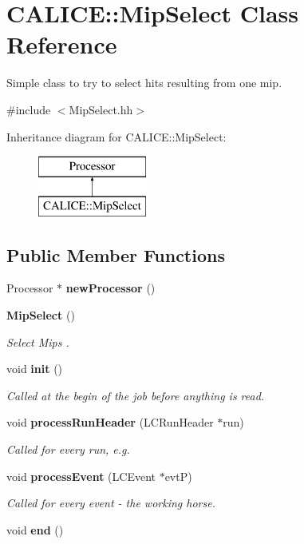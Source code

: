 \section{C\-A\-L\-I\-C\-E\-:\-:Mip\-Select Class Reference}
\label{classCALICE_1_1MipSelect}


Simple class to try to select hits resulting from one mip.  




{\ttfamily \#include $<$Mip\-Select.\-hh$>$}

Inheritance diagram for C\-A\-L\-I\-C\-E\-:\-:Mip\-Select\-:\begin{figure}[H]
\begin{center}
\leavevmode
\includegraphics[height=2.000000cm]{classCALICE_1_1MipSelect}
\end{center}
\end{figure}
\subsection*{Public Member Functions}
\begin{DoxyCompactItemize}
\item 
Processor $\ast$ {\bfseries new\-Processor} ()\label{classCALICE_1_1MipSelect_a0f4980cc56e6302a351f1029f1259655}

\item 
{\bf Mip\-Select} ()
\begin{DoxyCompactList}\small\item\em Select Mips . \end{DoxyCompactList}\item 
void {\bf init} ()
\begin{DoxyCompactList}\small\item\em Called at the begin of the job before anything is read. \end{DoxyCompactList}\item 
void {\bf process\-Run\-Header} (L\-C\-Run\-Header $\ast$run)
\begin{DoxyCompactList}\small\item\em Called for every run, e.\-g. \end{DoxyCompactList}\item 
void {\bf process\-Event} (L\-C\-Event $\ast$evt\-P)\label{classCALICE_1_1MipSelect_a4fda653147df06d659939dfe36aceb34}

\begin{DoxyCompactList}\small\item\em Called for every event -\/ the working horse. \end{DoxyCompactList}\item 
void {\bfseries end} ()\label{classCALICE_1_1MipSelect_aa1e14b5e9e444acae637f2cbcc0511e0}

\end{DoxyCompactItemize}
